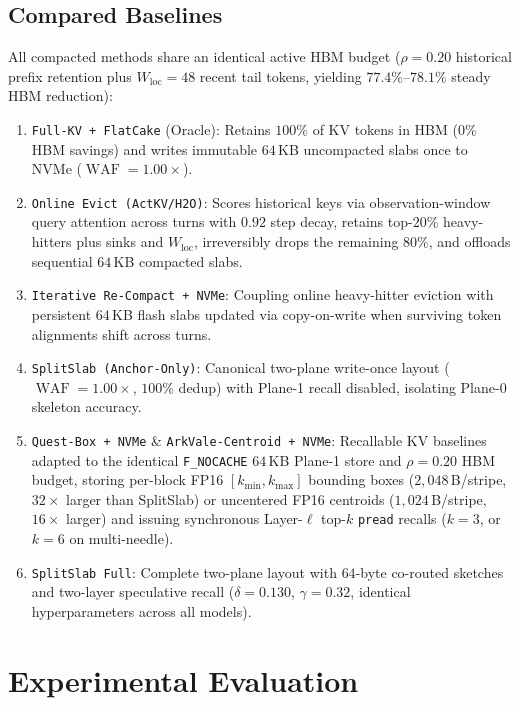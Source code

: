 \documentclass[final,5p,times,twocolumn]{elsarticle}
\theoremstyle{definition}
\theoremstyle{remark}
\newcommand{\SplitSlab}{\textup{\textsc{SplitSlab}}}
\newcommand{\WAF}{\operatorname{WAF}}
\def\SplitSlab{SplitSlab}%
\begin{document}
\subsection{Compared Baselines}
All compacted methods share an identical active HBM budget ($\rho = 0.20$ historical prefix retention plus $W_{\mathrm{loc}} = 48$ recent tail tokens, yielding $77.4\%$--$78.1\%$ steady HBM reduction):
\begin{enumerate}
  \item \texttt{Full-KV + FlatCake} (Oracle): Retains $100\%$ of KV tokens in HBM ($0\%$ HBM savings) and writes immutable $64$\,KB uncompacted slabs once to NVMe ($\WAF = 1.00\times$).
  \item \texttt{Online Evict (\texttt{ActKV}/\texttt{H2O})}: Scores historical keys via observation-window query attention across turns with $0.92$ step decay, retains top-$20\%$ heavy-hitters plus sinks and $W_{\mathrm{loc}}$, irreversibly drops the remaining $80\%$, and offloads sequential $64$\,KB compacted slabs.
  \item \texttt{Iterative Re-Compact + NVMe}: Coupling online heavy-hitter eviction with persistent $64$\,KB flash slabs updated via copy-on-write when surviving token alignments shift across turns.
  \item \texttt{\SplitSlab{} (Anchor-Only)}: Canonical two-plane write-once layout ($\WAF = 1.00\times$, $100\%$ dedup) with Plane-1 recall disabled, isolating Plane-0 skeleton accuracy.
  \item \texttt{Quest-Box + NVMe} \& \texttt{ArkVale-Centroid + NVMe}: Recallable KV baselines adapted to the identical \texttt{F\_NOCACHE} $64$\,KB Plane-1 store and $\rho{=}0.20$ HBM budget, storing per-block FP16 $[k_{\min}, k_{\max}]$ bounding boxes ($2{,}048$\,B/stripe, $32\times$ larger than \SplitSlab{}) or uncentered FP16 centroids ($1{,}024$\,B/stripe, $16\times$ larger) and issuing synchronous Layer-$\ell$ top-$k$ \texttt{pread} recalls ($k{=}3$, or $k{=}6$ on multi-needle).
  \item \texttt{\SplitSlab{} Full}: Complete two-plane layout with $64$-byte co-routed sketches and two-layer speculative recall ($\delta = 0.130$, $\gamma = 0.32$, identical hyperparameters across all models).
\end{enumerate}

\section{Experimental Evaluation}\label{sec:eval}
\end{document}
